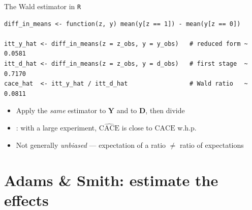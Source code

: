 \documentclass[table, xcolor = {dvipsnames}, 9pt]{beamer}
\theoremstyle{plain}
\newcommand{\mh}[1]{{\color{magenta}{#1}}}
\newcommand{\CACE}{\mathrm{CACE}}
\begin{document}
\begin{frame}[fragile]{The Wald estimator in \texttt{R}}
\begin{lstlisting}[style=Rstyle, basicstyle=\ttfamily\tiny, frame=single]
diff_in_means <- function(z, y) mean(y[z == 1]) - mean(y[z == 0])

itt_y_hat <- diff_in_means(z = z_obs, y = y_obs)   # reduced form ~ 0.0581
itt_d_hat <- diff_in_means(z = z_obs, y = d_obs)   # first stage  ~ 0.7170
cace_hat  <- itt_y_hat / itt_d_hat                 # Wald ratio   ~ 0.0811
\end{lstlisting}
\vfill
\begin{itemize} \vfill
\item Apply the \emph{same} estimator to $\bm{Y}$ and to $\bm{D}$, then divide \vfill
\item \mh{Consistent}: with a large experiment, $\widehat{\CACE}$ is close to $\CACE$ w.h.p. \vfill
\item Not generally \emph{unbiased} --- expectation of a ratio $\neq$ ratio of expectations \vfill
\end{itemize}
\end{frame}
\section{Adams \& Smith: estimate the effects}
\end{document}
